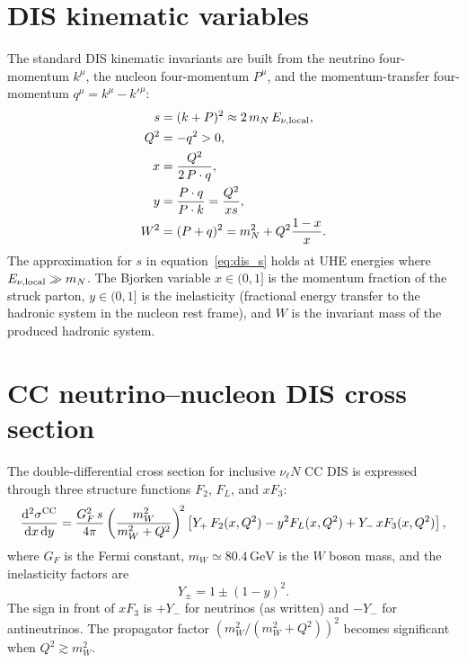 \documentclass[11pt,a4paper]{report}
\numberwithin{equation}{chapter}
\newcommand{\dd}{\mathrm{d}}
\begin{document}
\section{DIS kinematic variables}

The standard DIS kinematic invariants are built from the neutrino
four-momentum $k^\mu$, the nucleon four-momentum $P^\mu$, and the
momentum-transfer four-momentum $q^\mu = k^\mu - k'^\mu$:
\begin{align}
s &= (k+P)^2 \approx 2\,m_N\,E_{\nu,\rm local},\label{eq:dis_s}\\
Q^2 &= -q^2 > 0,\label{eq:dis_Q2}\\
x &= \frac{Q^2}{2\,P\cdot q},\label{eq:dis_x}\\
y &= \frac{P\cdot q}{P\cdot k} = \frac{Q^2}{xs},\label{eq:dis_y}\\
W^2 &= (P+q)^2 = m_N^2 + Q^2\frac{1-x}{x}.\label{eq:dis_W2}
\end{align}
The approximation for $s$ in equation~\eqref{eq:dis_s} holds at UHE energies
where $E_{\nu,\rm local}\gg m_N$. The Bjorken variable $x\in(0,1]$ is the
momentum fraction of the struck parton, $y\in(0,1]$ is the inelasticity
(fractional energy transfer to the hadronic system in the nucleon rest frame),
and $W$ is the invariant mass of the produced hadronic system.

\section{CC neutrino--nucleon DIS cross section}

The double-differential cross section for inclusive $\nu_\ell N$ CC DIS is
expressed through three structure functions $F_2$, $F_L$, and $xF_3$:
\begin{equation}
\frac{\dd^2\sigma^{\rm CC}}{\dd x\,\dd y}
=
\frac{G_F^2\,s}{4\pi}
\left(\frac{m_W^2}{m_W^2+Q^2}\right)^{\!2}
\left[
  Y_+\,F_2(x,Q^2)
  -y^2 F_L(x,Q^2)
  +Y_-\,xF_3(x,Q^2)
\right],
\label{eq:dis_xsec}
\end{equation}
where $G_F$ is the Fermi constant, $m_W\simeq 80.4\,\mathrm{GeV}$ is the $W$
boson mass, and the inelasticity factors are
\begin{equation}
Y_\pm = 1 \pm (1-y)^2.
\end{equation}
The sign in front of $xF_3$ is $+Y_-$ for neutrinos (as written) and
$-Y_-$ for antineutrinos. The propagator factor
$(m_W^2/(m_W^2+Q^2))^2$ becomes significant when $Q^2 \gtrsim m_W^2$.
\end{document}

